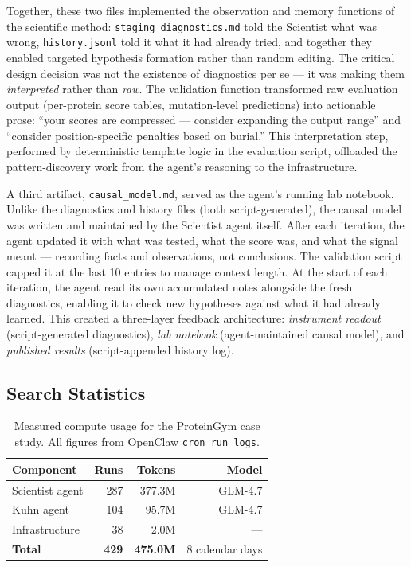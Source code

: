 \documentclass[11pt,a4paper]{article}
\begin{document}
Together, these two files implemented the observation and memory functions of the scientific method: \texttt{staging\_diagnostics.md} told the Scientist what was wrong, \texttt{history.jsonl} told it what it had already tried, and together they enabled targeted hypothesis formation rather than random editing. The critical design decision was not the existence of diagnostics per se --- it was making them \emph{interpreted} rather than \emph{raw}. The validation function transformed raw evaluation output (per-protein score tables, mutation-level predictions) into actionable prose: ``your scores are compressed --- consider expanding the output range'' and ``consider position-specific penalties based on burial.'' This interpretation step, performed by deterministic template logic in the evaluation script, offloaded the pattern-discovery work from the agent's reasoning to the infrastructure.

A third artifact, \texttt{causal\_model.md}, served as the agent's running lab notebook. Unlike the diagnostics and history files (both script-generated), the causal model was written and maintained by the Scientist agent itself. After each iteration, the agent updated it with what was tested, what the score was, and what the signal meant --- recording facts and observations, not conclusions. The validation script capped it at the last 10 entries to manage context length. At the start of each iteration, the agent read its own accumulated notes alongside the fresh diagnostics, enabling it to check new hypotheses against what it had already learned. This created a three-layer feedback architecture: \emph{instrument readout} (script-generated diagnostics), \emph{lab notebook} (agent-maintained causal model), and \emph{published results} (script-appended history log).

\subsection{Search Statistics}

\begin{table}[H]
\centering
\caption{Measured compute usage for the ProteinGym case study. All figures from OpenClaw \texttt{cron\_run\_logs}.}
\label{tab:pg_search_stats}
\small
\begin{tabular}{lrrr}
\toprule
Component & Runs & Tokens & Model \\
\midrule
Scientist agent   & 287 & 377.3M & GLM-4.7 \\
Kuhn agent        & 104 &  95.7M & GLM-4.7 \\
Infrastructure    &  38 &   2.0M & --- \\
\midrule
\textbf{Total} & \textbf{429} & \textbf{475.0M} & 8 calendar days \\
\bottomrule
\end{tabular}
\end{table}
\end{document}
